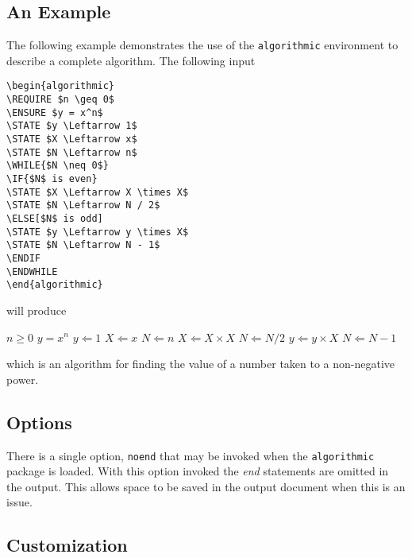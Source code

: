 \documentclass{article}
\begin{document}
\subsection{An Example}

The following example demonstrates the use of the \texttt{algorithmic}
environment to describe a complete algorithm.
The following input
\begin{verbatim}
\begin{algorithmic}
\REQUIRE $n \geq 0$
\ENSURE $y = x^n$
\STATE $y \Leftarrow 1$
\STATE $X \Leftarrow x$
\STATE $N \Leftarrow n$
\WHILE{$N \neq 0$}
\IF{$N$ is even}
\STATE $X \Leftarrow X \times X$
\STATE $N \Leftarrow N / 2$
\ELSE[$N$ is odd]
\STATE $y \Leftarrow y \times X$
\STATE $N \Leftarrow N - 1$
\ENDIF
\ENDWHILE
\end{algorithmic}
\end{verbatim}
will produce
\begin{algorithmic}
\REQUIRE $n \geq 0$
\ENSURE $y = x^n$
\STATE $y \Leftarrow 1$
\STATE $X \Leftarrow x$
\STATE $N \Leftarrow n$
\STATE $X \Leftarrow X \times X$
\STATE $N \Leftarrow N / 2$
\ELSE[$N$ is odd]
\STATE $y \Leftarrow y \times X$
\STATE $N \Leftarrow N - 1$
\ENDIF
\ENDWHILE
\end{algorithmic}
which is an algorithm for finding the value of a number taken to a
non-negative power.

\subsection{Options}

There is a single option, \texttt{noend} that may be invoked when
the \texttt{algorithmic} package is loaded.
With this option invoked the {\em end} statements are omitted in the
output.
This allows space to be saved in the output document when this is an issue.

\subsection{Customization}
\end{document}
